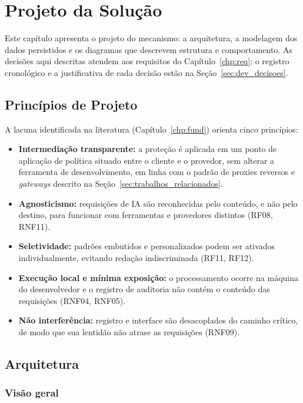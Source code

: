 \chapter{Projeto da Solução}\label{chp:proj}

Este capítulo apresenta o projeto do mecanismo: a arquitetura, a modelagem dos dados persistidos e os diagramas que descrevem estrutura e comportamento. As decisões aqui descritas atendem aos requisitos do Capítulo~\ref{chp:req}; o registro cronológico e a justificativa de cada decisão estão na Seção~\ref{sec:dev_decisoes}.

\section{Princípios de Projeto}

A lacuna identificada na literatura (Capítulo~\ref{chp:fund}) orienta cinco princípios:

\begin{itemize}
    \item \textbf{Intermediação transparente:} a proteção é aplicada em um ponto de aplicação de política situado entre o cliente e o provedor, sem alterar a ferramenta de desenvolvimento, em linha com o padrão de proxies reversos e \textit{gateways} descrito na Seção~\ref{sec:trabalhos_relacionados}.
    \item \textbf{Agnosticismo:} requisições de IA são reconhecidas pelo conteúdo, e não pelo destino, para funcionar com ferramentas e provedores distintos (RF08, RNF11).
    \item \textbf{Seletividade:} padrões embutidos e personalizados podem ser ativados individualmente, evitando redação indiscriminada (RF11, RF12).
    \item \textbf{Execução local e mínima exposição:} o processamento ocorre na máquina do desenvolvedor e o registro de auditoria não contém o conteúdo das requisições (RNF04, RNF05).
    \item \textbf{Não interferência:} registro e interface são desacoplados do caminho crítico, de modo que sua lentidão não atrase as requisições (RNF09).
\end{itemize}

\section{Arquitetura}
\label{sec:proj_arq}

\subsection{Visão geral}

